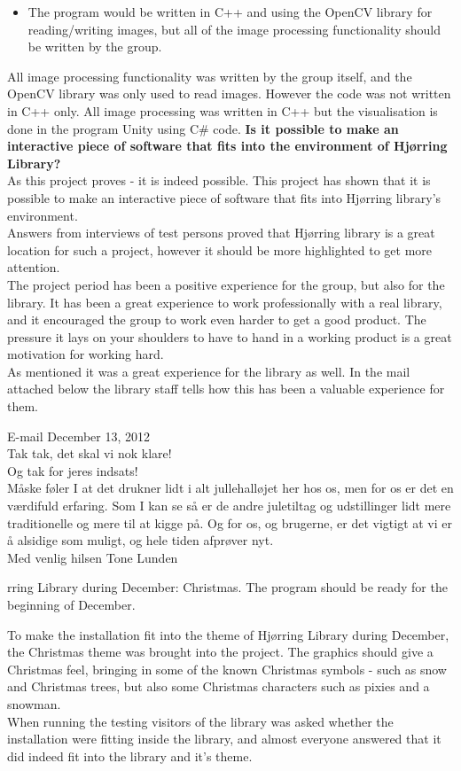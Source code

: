 \begin{itemize}
\begin{itemize}
\item The program would be written in C++ and using the OpenCV library for reading/writing images, but all of the image processing functionality should be written by the group.
\end{itemize}
All image processing functionality was written by the group itself, and the OpenCV library was only used to read images. However the code was not written in C++ only. All image processing was written in C++ but the visualisation is done in the program Unity using C\# code.
\textbf{Is it possible to make an interactive piece of software that fits into the environment of Hj{\o}rring Library?}\\
As this project proves - it is indeed possible. This project has shown that it is possible to make an interactive piece of software that fits into Hj{\o}rring library's environment.\\
Answers from interviews of test persons proved that Hj{\o}rring library is a great location for such a project, however it should be more highlighted to get more attention. \\
The project period has been a positive experience for the group, but also for the library. It has been a great experience to work professionally with a real library, and it encouraged the group to work even harder to get a good product. The pressure it lays on your shoulders to have to hand in a working product is a great motivation for working hard. \\
As mentioned it was a great experience for the library as well. In the mail attached below the library staff tells how this has been a valuable experience for them.
\begin{fancyquotes}
E-mail December 13, 2012\\
Tak tak, det skal vi nok klare!\\
Og tak for jeres indsats!\\
M{\aa}ske f{\o}ler I at det drukner lidt i alt jullehall{\o}jet her hos os, men for os er det en v{\ae}rdifuld erfaring. Som I kan se s{\aa} er de andre juletiltag og udstillinger lidt mere traditionelle og mere til at kigge p{\aa}. Og for os, og brugerne, er det vigtigt at vi er {\aa} alsidige som muligt, og hele tiden afpr{\o}ver nyt.\\
Med venlig hilsen
Tone Lunden
\end{fancyquotes}
rring Library during December: Christmas. The program should be ready for the beginning of December.
\end{itemize}
To make the installation fit into the theme of Hj{\o}rring Library during December, the Christmas theme was brought into the project. The graphics should give a Christmas feel, bringing in some of the known Christmas symbols - such as snow and Christmas trees, but also some Christmas characters such as pixies and a snowman.\\
When running the testing visitors of the library was asked whether the installation were fitting inside the library, and almost everyone answered that it did indeed fit into the library and it's theme.

